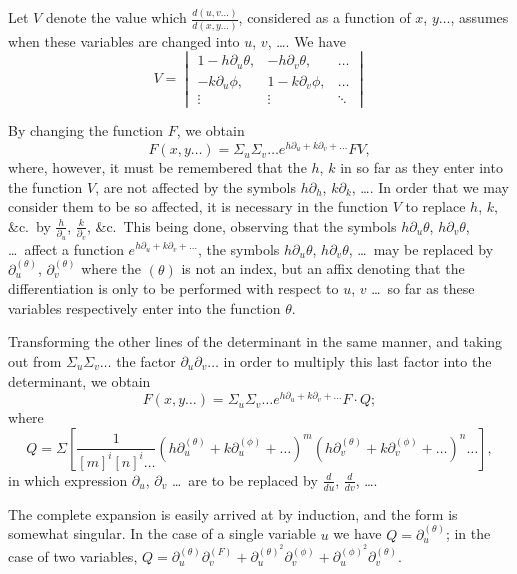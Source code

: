 \documentclass[11pt,a4paper]{book}
\begin{document}
Let $V$ denote the value which $\frac{d(u,v\ldots)}{d(x,y\ldots)}$, considered as a function of $x$, $y \ldots$, assumes when these variables are changed into $u$, $v$, \ldots. We have
\[
V = \begin{vmatrix}
1 - h\partial_u \theta, & -h\partial_v \theta, & \ldots \\
-k\partial_u \phi, & 1 - k\partial_v \phi, & \ldots \\
\vdots & \vdots & \ddots
\end{vmatrix}
\]

By changing the function $F$, we obtain
\[ F(x,y\ldots) = \Sigma_u \Sigma_v \ldots e^{h\partial_u + k\partial_v + \ldots} FV, \]
where, however, it must be remembered that the $h$, $k$ in so far as they enter into the function $V$, are not affected by the symbols $h\partial_h$, $k\partial_k$, \ldots. In order that we may consider them to be so affected, it is necessary in the function $V$ to replace $h$, $k$, \&c.\ by $\frac{h}{\partial_u}$, $\frac{k}{\partial_v}$, \&c.\ This being done, observing that the symbols $h\partial_u \theta$, $h\partial_v \theta$, \ldots\ affect a function $e^{h\partial_u + k\partial_v + \ldots}$, the symbols $h\partial_u \theta$, $h\partial_v \theta$, \ldots\ may be replaced by $\partial_u^{(\theta)}$, $\partial_v^{(\theta)}$ where the $(\theta)$ is not an index, but an affix denoting that the differentiation is only to be performed with respect to $u$, $v$ \ldots\ so far as these variables respectively enter into the function $\theta$.

Transforming the other lines of the determinant in the same manner, and taking out from $\Sigma_u \Sigma_v \ldots$ the factor $\partial_u \partial_v \ldots$ in order to multiply this last factor into the determinant, we obtain
\[ F(x,y\ldots) = \Sigma_u \Sigma_v \ldots e^{h\partial_u + k\partial_v + \ldots} F \cdot Q; \]
where
\[ Q = \Sigma \left[ \frac{1}{[m]^i [n]^i \ldots} (h\partial_u^{(\theta)} + k\partial_u^{(\phi)} + \ldots)^m (h\partial_v^{(\theta)} + k\partial_v^{(\phi)} + \ldots)^n \ldots \right], \]
in which expression $\partial_u$, $\partial_v$ \ldots\ are to be replaced by $\frac{d}{du}$, $\frac{d}{dv}$, \ldots.

The complete expansion is easily arrived at by induction, and the form is somewhat singular. In the case of a single variable $u$ we have $Q = \partial_u^{(\theta)}$; in the case of two variables, $Q = \partial_u^{(\theta)} \partial_v^{(F)} + \partial_u^{(\theta)^2} \partial_v^{(\phi)} + \partial_u^{(\phi)^2} \partial_v^{(\theta)}$.
\end{document}
